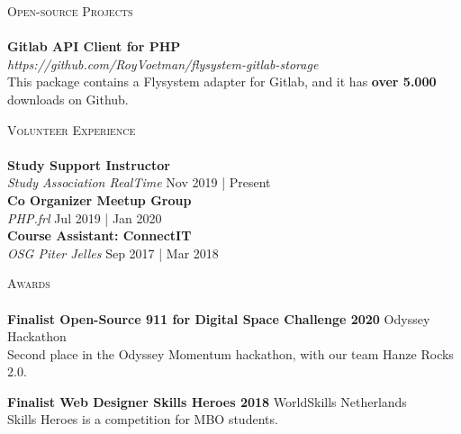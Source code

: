 \documentclass[a4paper]{article}
\newcommand{\lineunder} {
    \vspace*{-8pt} \\
    \hspace*{-18pt} \hrulefill \\
}
\newcommand{\header} [1] {
    {\hspace*{-18pt}\vspace*{6pt} \textsc{#1}}
    \vspace*{-6pt} \lineunder
}
\begin{document}
\vspace{5mm}

\header{Open-source Projects}
{\textbf{Gitlab API Client for PHP}} \\ \emph{https://github.com/RoyVoetman/flysystem-gitlab-storage}\\
This package contains a Flysystem adapter for Gitlab, and it has \textbf{over 5.000} downloads on Github.
\vspace*{2mm}

\vspace{5mm}

\header{Volunteer Experience}
\vspace{1mm}
\textbf{Study Support Instructor} \hfill\\
\textit{Study Association RealTime} \hfill Nov 2019 | Present\\
\vspace{2mm}
\textbf{Co Organizer Meetup Group} \hfill\\
\textit{PHP.frl} \hfill Jul 2019 | Jan 2020\\
\vspace{2mm}
\textbf{Course Assistant: ConnectIT} \hfill\\
\textit{OSG Piter Jelles} \hfill Sep 2017 | Mar 2018\\
\vspace{2mm}

\vspace{5mm}

\header{Awards}
\textbf{Finalist Open-Source 911 for Digital Space Challenge 2020} \hfill Odyssey Hackathon\\
Second place in the Odyssey Momentum hackathon, with our team Hanze Rocks 2.0.
\vspace*{2mm}

\textbf{Finalist Web Designer Skills Heroes 2018} \hfill WorldSkills Netherlands\\
Skills Heroes is a competition for MBO students.
\vspace*{2mm}

\ 
\end{document}
